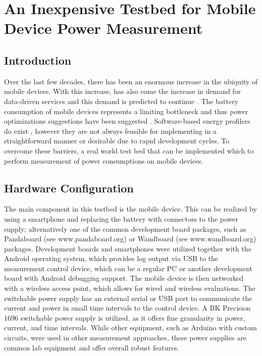 \chapter{An Inexpensive Testbed for Mobile Device Power Measurement} 
\label{ch:testbed}


\section*{Introduction}

Over the last few decades, there has been an enormous increase in the ubiquity of mobile devices. With this increase, has also come the increase in demand for data-driven services and this demand is predicted to continue \cite{VNI14}. The battery consumption of mobile devices represents a limiting bottleneck and thus  power optimizations suggestions have been suggested \cite{Qian:2012:PTM:2187836.2187844}. Software-based energy profilers do exist \cite{DAmato:2011:EAE:2419622.2419929}, however they are not always feasible for implementing in a straightforward manner or desirable due to rapid development cycles. To overcome these barriers, a real world test bed that can be implemented which to perform measurement of power consumptions on mobile devices.

\section*{Hardware Configuration}

The main component in this testbed is the mobile device.
This can be realized by using a smartphone and replacing the
battery with connectors to the power supply; alternatively one
of the common development board packages, such as
Pandaboard (see www.pandaboard.org) or Wandboard (see
www.wandboard.org) packages. Development boards and smartphones were utilized together with the
Android operating system, which provides log output via USB
to the measurement control device, which can be a regular PC
or another development board with Android debugging
support. The mobile device is then networked with a wireless access point, which allows for wired and wireless evaluations.
The switchable power supply has an external serial or USB
port to communicate the current and power in small time
intervals to the control device. A BK Precision
1696 switchable power supply is utilized, as it offers fine granularity in power, current, and time intervals. While other equipment, such as Arduino with custom circuits, were used in other measurement approaches, these power supplies are common lab equipment and offer overall robust features.

